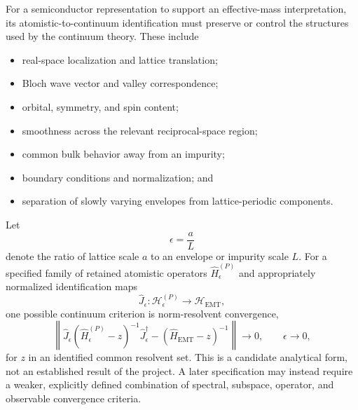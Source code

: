For a semiconductor representation to support an effective-mass
interpretation, its atomistic-to-continuum identification must preserve or
control the structures used by the continuum theory. These include
\begin{itemize}
    \item real-space localization and lattice translation;
    \item Bloch wave vector and valley correspondence;
    \item orbital, symmetry, and spin content;
    \item smoothness across the relevant reciprocal-space region;
    \item common bulk behavior away from an impurity;
    \item boundary conditions and normalization; and
    \item separation of slowly varying envelopes from lattice-periodic
          components.
\end{itemize}

Let
\begin{equation}
    \epsilon=\frac{a}{L}
\end{equation}
denote the ratio of lattice scale $a$ to an envelope or impurity scale $L$.
For a specified family of retained atomistic operators
$\hat H_\epsilon^{(P)}$ and appropriately normalized identification maps
\begin{equation}
    \hat J_\epsilon:
    \mathcal H_\epsilon^{(P)}
    \longrightarrow
    \mathcal H_{\mathrm{EMT}},
\end{equation}
one possible continuum criterion is norm-resolvent convergence,
\begin{equation}
    \left\|
        \hat J_\epsilon
        \left(\hat H_\epsilon^{(P)}-z\right)^{-1}
        \hat J_\epsilon^\dagger
        -
        \left(\hat H_{\mathrm{EMT}}-z\right)^{-1}
    \right\|
    \longrightarrow 0,
    \qquad
    \epsilon\longrightarrow 0,
\end{equation}
for $z$ in an identified common resolvent set. This is a candidate analytical
form, not an established result of the project. A later specification may
instead require a weaker, explicitly defined combination of spectral,
subspace, operator, and observable convergence criteria.


